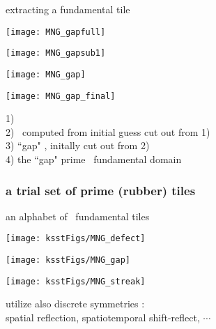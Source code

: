 \begin{frame}{extracting a fundamental tile}
\begin{minipage}[height=.60\textheight]{.24\textheight}
\centering %
\texttt{[image: MNG\_gapfull]}
\end{minipage} \quad
\begin{minipage}[height=.60\textheight]{.24\textheight}
\centering %
\texttt{[image: MNG\_gapsub1]}
\end{minipage} \quad
\begin{minipage}[height=.60\textheight]{.18\textheight}
\centering             %
\texttt{[image: MNG\_gap]}
\end{minipage} \quad
\begin{minipage}[height=.60\textheight]{.12\textheight}
\centering %
\texttt{[image: MNG\_gap\_final]}
\end{minipage}

1) \twot\ %
    \\
2) \twot\ computed from initial guess cut out from 1)
    \\
3) ``gap" \twot, %
     initally cut out from 2)
     \\
4) the ``gap"  prime  \twot\ fundamental domain
\end{frame}

\begin{frame}%
  \frametitle{a trial set of prime (rubber) tiles}
  \begin{block} {an alphabet of \KS\ fundamental tiles}
\begin{minipage}[height=.60\textheight]{.25\textheight}
\centering             %
\texttt{[image: ksstFigs/MNG\_defect]}
\end{minipage} \qquad
\begin{minipage}[height=.60\textheight]{.25\textheight}
\centering     %
\texttt{[image: ksstFigs/MNG\_gap]}
\end{minipage} \qquad
\begin{minipage}[height=.60\textheight]{.25\textheight}
\centering             %
\texttt{[image: ksstFigs/MNG\_streak]}
\end{minipage}
  \end{block}
\vfill
utilize also discrete symmetries : \\
spatial reflection, spatiotemporal shift-reflect,
$\cdots$
\end{frame}

